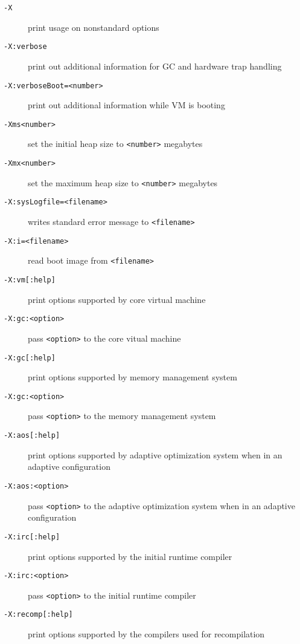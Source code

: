 \begin{description}
\item [{\tt -X}]
print usage on nonstandard options

\item[{\tt -X:verbose}]
print out additional information for GC and hardware trap handling

\item[{\tt -X:verboseBoot=<number>}]
print out additional information while VM is booting

\item[{\tt -Xms<number>}]
set the initial heap size to {\tt <number>} megabytes

\item[{\tt -Xmx<number>}]
set the maximum heap size to {\tt <number>} megabytes

\item[{\tt -X:sysLogfile=<filename>}]
writes standard error message to {\tt <filename>}

\item[{\tt -X:i=<filename>}]
read boot image from {\tt <filename>}

\item[{\tt -X:vm[:help]}]
print options supported by core virtual machine

\item[{\tt -X:gc:<option>}]
pass {\tt <option>} to the core vitual machine

\item[{\tt -X:gc[:help]}]
print options supported by memory management system

\item[{\tt -X:gc:<option>}]
pass {\tt <option>} to the memory management system

\item[{\tt -X:aos[:help]}]
print options supported by adaptive optimization system when in an
adaptive configuration

\item[{\tt -X:aos:<option>}]
pass {\tt <option>} to the adaptive optimization system when in an adaptive configuration

\item[{\tt -X:irc[:help]}]
print options supported by the initial runtime compiler

\item[{\tt -X:irc:<option>}]
pass {\tt <option>} to the initial runtime compiler

\item[{\tt -X:recomp[:help]}]
print options supported by the compilers used for recompilation


\end{description}
